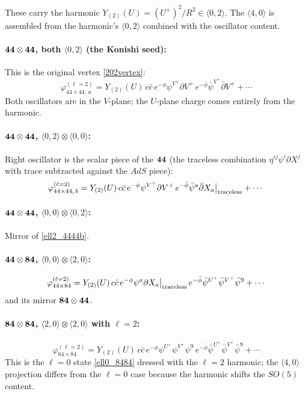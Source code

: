 \documentclass[12pt]{article}
\def\be{\begin{equation}}
\def\ee{\end{equation}}
\begin{document}
These carry the harmonic $Y_{(2)}(U)=(U^+)^2/R^2\in\langle 0,2\rangle$.
The $\langle 4,0\rangle$ is assembled from the harmonic's $\langle 0,2\rangle$
combined with the oscillator content.

\paragraph{${\bf 44}\otimes{\bf 44}$, both $\langle 0,2\rangle$ (the Konishi seed):}
This is the original vertex \eqref{202vertex}:
\be\label{ell2_4444a}
\varphi^{(\ell=2)}_{44\times 44,\, a}
= Y_{(2)}(U)\, c\bar c\,
e^{-\phi}\psi^{V^+}\partial V^+\,
e^{-\bar\phi}\bar\psi^{V^+}\bar\partial V^+
+\cdots
\ee
Both oscillators are in the $V$-plane; the $U$-plane charge comes entirely from the harmonic.

\paragraph{${\bf 44}\otimes{\bf 44}$, $\langle 0,2\rangle\otimes\langle 0,0\rangle$:}
Right oscillator is the scalar piece of the ${\bf 44}$ (the traceless combination
$\eta^{ij}\psi^i\partial X^j$ with trace subtracted against the $AdS$ piece):
\be\label{ell2_4444b}
\varphi^{(\ell=2)}_{44\times 44,\, b}
= Y_{(2)}(U)\, c\bar c\,
e^{-\phi}\psi^{V^+}\partial V^+\,
e^{-\bar\phi}\bar\psi^a\bar\partial X_a\big|_{\rm traceless}
+\cdots
\ee

\paragraph{${\bf 44}\otimes{\bf 44}$, $\langle 0,0\rangle\otimes\langle 0,2\rangle$:}
Mirror of \eqref{ell2_4444b}.

\paragraph{${\bf 44}\otimes{\bf 84}$, $\langle 0,0\rangle\otimes\langle 2,0\rangle$:}
\be\label{ell2_4484}
\varphi^{(\ell=2)}_{44\times 84}
= Y_{(2)}(U)\, c\bar c\,
e^{-\phi}\psi^a\partial X_a\big|_{\rm traceless}\,
e^{-\bar\phi}\bar\psi^{U^+}\bar\psi^{V^+}\bar\psi^9
+\cdots
\ee
and its mirror ${\bf 84}\otimes{\bf 44}$.

\paragraph{${\bf 84}\otimes{\bf 84}$, $\langle 2,0\rangle\otimes\langle 2,0\rangle$ with $\ell=2$:}
\be\label{ell2_8484}
\varphi^{(\ell=2)}_{84\times 84}
= Y_{(2)}(U)\, c\bar c\,
e^{-\phi}\psi^{U^+}\psi^{V^+}\psi^9\,
e^{-\bar\phi}\bar\psi^{U^+}\bar\psi^{V^+}\bar\psi^9
+\cdots
\ee
This is the $\ell=0$ state \eqref{ell0_8484} dressed with the $\ell=2$ harmonic;
the $\langle 4,0\rangle$ projection differs from the $\ell=0$ case because
the harmonic shifts the $SO(5)$ content.
\end{document}
